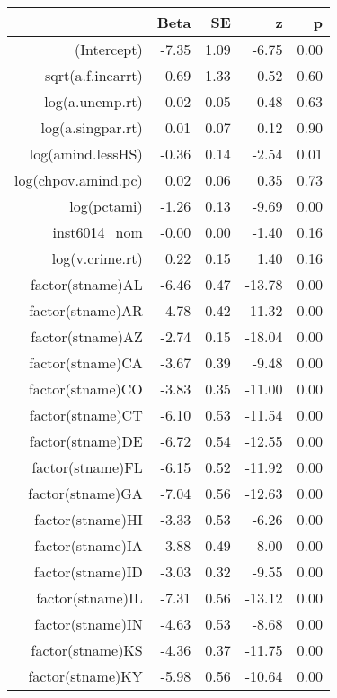 \begin{table}[ht]
\centering
\begin{tabular}{rrrrr}
  \hline
 & Beta & SE & z & p \\ 
  \hline
(Intercept) & -7.35 & 1.09 & -6.75 & 0.00 \\ 
  sqrt(a.f.incarrt) & 0.69 & 1.33 & 0.52 & 0.60 \\ 
  log(a.unemp.rt) & -0.02 & 0.05 & -0.48 & 0.63 \\ 
  log(a.singpar.rt) & 0.01 & 0.07 & 0.12 & 0.90 \\ 
  log(amind.lessHS) & -0.36 & 0.14 & -2.54 & 0.01 \\ 
  log(chpov.amind.pc) & 0.02 & 0.06 & 0.35 & 0.73 \\ 
  log(pctami) & -1.26 & 0.13 & -9.69 & 0.00 \\ 
  inst6014\_nom & -0.00 & 0.00 & -1.40 & 0.16 \\ 
  log(v.crime.rt) & 0.22 & 0.15 & 1.40 & 0.16 \\ 
  factor(stname)AL & -6.46 & 0.47 & -13.78 & 0.00 \\ 
  factor(stname)AR & -4.78 & 0.42 & -11.32 & 0.00 \\ 
  factor(stname)AZ & -2.74 & 0.15 & -18.04 & 0.00 \\ 
  factor(stname)CA & -3.67 & 0.39 & -9.48 & 0.00 \\ 
  factor(stname)CO & -3.83 & 0.35 & -11.00 & 0.00 \\ 
  factor(stname)CT & -6.10 & 0.53 & -11.54 & 0.00 \\ 
  factor(stname)DE & -6.72 & 0.54 & -12.55 & 0.00 \\ 
  factor(stname)FL & -6.15 & 0.52 & -11.92 & 0.00 \\ 
  factor(stname)GA & -7.04 & 0.56 & -12.63 & 0.00 \\ 
  factor(stname)HI & -3.33 & 0.53 & -6.26 & 0.00 \\ 
  factor(stname)IA & -3.88 & 0.49 & -8.00 & 0.00 \\ 
  factor(stname)ID & -3.03 & 0.32 & -9.55 & 0.00 \\ 
  factor(stname)IL & -7.31 & 0.56 & -13.12 & 0.00 \\ 
  factor(stname)IN & -4.63 & 0.53 & -8.68 & 0.00 \\ 
  factor(stname)KS & -4.36 & 0.37 & -11.75 & 0.00 \\ 
  factor(stname)KY & -5.98 & 0.56 & -10.64 & 0.00 \\ 

\end{tabular}
\end{table}
